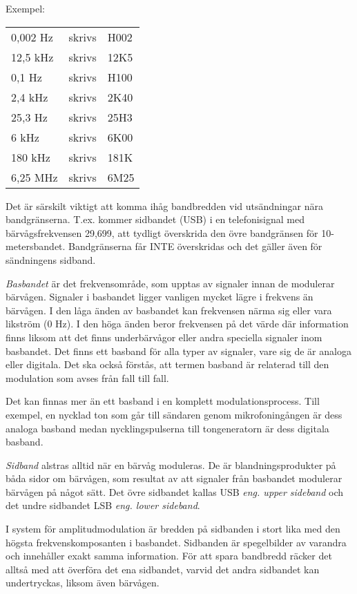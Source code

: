 Exempel:\\
\begin{tabular}{lll}
	0,002 Hz & skrivs & H002\\
	12,5 kHz & skrivs & 12K5\\
	0,1 Hz & skrivs & H100\\ 
	2,4 kHz & skrivs & 2K40\\
	25,3 Hz & skrivs & 25H3\\
	6 kHz & skrivs & 6K00\\
	180 kHz & skrivs & 181K\\
	6,25 MHz & skrivs & 6M25\\
\end{tabular}

Det är särskilt viktigt att komma ihåg bandbredden vid utsändningar nära
bandgränserna. T.ex. kommer sidbandet (USB) i en telefonisignal med
bärvågsfrekvensen 29,699, att tydligt överskrida den övre bandgränsen för
10-metersbandet. Bandgränserna får INTE överskridas och det gäller även för
sändningens sidband.

\emph{Basbandet} är det frekvensområde, som upptas av signaler innan de
modulerar bärvågen. Signaler i basbandet ligger vanligen mycket lägre i
frekvens än bärvågen. I den låga änden av basbandet kan frekvensen närma sig
eller vara likström (0 Hz). I den höga änden beror frekvensen på det värde där
information finns liksom att det finns underbärvågor eller andra speciella
signaler inom basbandet. Det finns ett basband för alla typer av signaler, vare
sig de är analoga eller digitala. Det ska också förstås, att termen basband är
relaterad till den modulation som avses från fall till fall.

Det kan finnas mer än ett basband i en komplett modulationsprocess. Till
exempel, en nycklad ton som går till sändaren genom mikrofoningången är dess
analoga basband medan nycklingspulserna till tongeneratorn är dess digitala
basband.

\emph{Sidband} alstras alltid när en bärvåg moduleras. De är blandningsprodukter
på båda sidor om bärvågen, som resultat av att signaler från basbandet modulerar
bärvågen på något sätt. Det övre sidbandet kallas USB \emph{eng. upper sideband}
och det undre sidbandet LSB \emph{eng. lower sideband}.

I system för amplitudmodulation är bredden på sidbanden i stort lika med den
högsta frekvenskomposanten i basbandet. Sidbanden är spegelbilder av varandra
och innehåller exakt samma information. För att spara bandbredd räcker det
alltså med att överföra det ena sidbandet, varvid det andra sidbandet kan
undertryckas, liksom även bärvågen.

